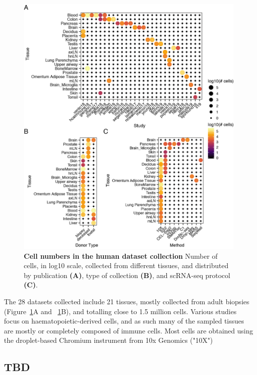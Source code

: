 \begin{figure}[ht!]
    \centering    
    \includegraphics[width=1.0\textwidth]{Chapter4/Figs/chap4_countsHumanAtlas.png} %
    \caption[Cell numbers in the human dataset collection]{\textbf{Cell numbers in the human dataset collection} \newline Number of cells, in log10 scale, collected from different tissues, and distributed by publication \textbf{(A)}, type of collection \textbf{(B)}, and scRNA-seq protocol \textbf{(C)}.}
    \label{fig:chap4_cha}
\end{figure}

The 28 datasets collected include 21 tissues, mostly collected from adult biopsies (Figure~\ref{fig:chap4_cha}A and ~\ref{fig:chap4_cha}B), and totalling close to 1.5 million cells. Various studies focus on haematopoietic-derived cells, and as such many of the sampled tissues are mostly or completely composed of immune cells. Most cells are obtained using the droplet-based Chromium instrument from 10x Genomics ("10X")



\subsection{TBD}
\label{section4.2_test}



